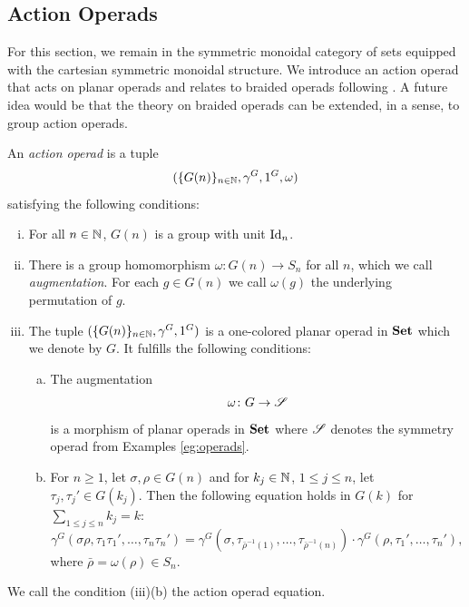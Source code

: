 \subsection{Action Operads}
For this section, we remain in the symmetric monoidal category of sets equipped
with the cartesian symmetric monoidal structure. We introduce an action
operad that acts on planar operads and relates to braided operads following
\cite[Chapter 4]{yau}. A future idea would be that the theory on braided operads can be extended,
in a sense, to group action operads.

\begin{defin}
    An {\em action operad} is a tuple
    \[
        (\{G(n)\}_{n \in \N}, \gamma^G, 1^G, \omega)
    \]
    satisfying the following conditions:
    \begin{enumerate}[(i)]
        \item For all $n \in \N$, $G(n)$ is a group with unit $\id_n$.
        \item There is a group homomorphism $\omega \colon G(n) \to S_n$ for all
        $n$, which we call \emph{augmentation}. For each $g \in G(n)$ we call
        $\omega(g)$ the underlying permutation of $g$.
        \item The tuple $(\{G(n)\}_{n \in \N}, \gamma^G, 1^G)$ is a one-colored
        planar operad in $\Set$ which we denote by $G$. It fulfills the
        following conditions:
        \begin{enumerate}[(a)]
            \item The augmentation
            \[
            \omega \colon G \to \S
            \]
            is a morphism of planar operads in $\Set$ where $\S$ denotes the
            symmetry operad from Examples \ref{eg:operads}.
            \item For $n \geq 1$, let $\sigma, \rho \in G(n)$ and for $k_j \in
            \N$, $1 \leq j \leq n$, let $\tau_j, \tau_j' \in G(k_j)$. Then the
            following equation holds in $G(k)$ for $ \sum_{1 \leq j \leq n} k_j
            = k$:
            \[
                \gamma^G(\sigma \rho, \tau_1 \tau_1', \dots, \tau_n \tau_n') = \gamma^G(\sigma, \tau_{\bar{\rho}^{-1}(1)}, \dots, \tau_{\bar{\rho}^{-1}(n)}) \cdot \gamma^G(\rho, \tau_1', \dots, \tau_n'),
            \]
            where $\bar{\rho} = \omega(\rho) \in S_n$.
        \end{enumerate}
    \end{enumerate}
\end{defin}
We call the condition (iii)(b) the action operad equation.

